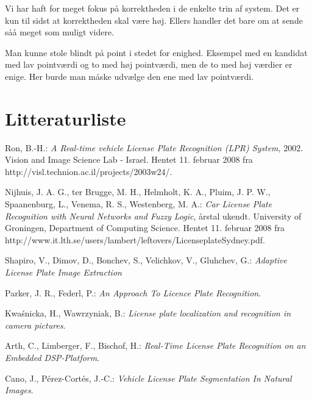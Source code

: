 \documentclass[11pt,a4paper,final]{article}
\begin{document}
Vi har haft for meget fokus på korrektheden i de enkelte trin af system. Det er kun til sidst at korrektheden skal være høj. Ellers handler det bare om at sende såå meget som muligt videre.

Man kunne stole blindt på point i stedet for enighed. Eksempel med en kandidat med lav pointværdi og to med høj pointværdi, men de to med høj værdier er enige. Her burde man måske udvælge den ene med lav pointværdi.

\newpage %
\section{Litteraturliste}

\begin{thebibliography}{99}
%

 Ron, B.-H.: \textit{A Real-time vehicle License Plate Recognition (LPR) System}, 2002. Vision and Image Science Lab - Israel. Hentet 11. februar 2008 fra http://visl.technion.ac.il/projects/2003w24/.

 Nijhuis, J. A. G., ter Brugge, M. H., Helmholt, K. A., Pluim, J. P. W., Spaanenburg, L., Venema, R. S., Westenberg, M. A.: \textit{Car License Plate Recognition with Neural Networks and Fuzzy Logic}, årstal ukendt. University of Groningen, Department of Computing Science. Hentet 11. februar 2008 fra http://www.it.lth.se/users/lambert/leftovers/LicenseplateSydney.pdf.

 Shapiro, V., Dimov, D., Bonchev, S., Velichkov, V., Gluhchev, G.: \textit{Adaptive License Plate Image Extraction}

 Parker, J. R., Federl, P.: \textit{An Approach To Licence Plate Recognition}.

 Kwa\'snicka, H., Wawrzyniak, B.: \textit{License plate localization and recognition in camera pictures}.

 Arth, C., Limberger, F., Bischof, H.: \textit{Real-Time License Plate Recognition on an Embedded DSP-Platform}.

 Cano, J., Pérez-Cortés, J.-C.: \textit{Vehicle License Plate Segmentation In Natural Images}.




\end{thebibliography}
\end{document}
